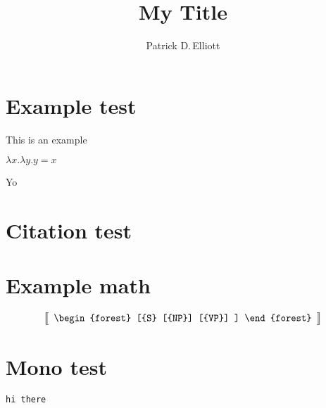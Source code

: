 \documentclass{ling-paper}
\title{My Title}
\author{Patrick D.\,Elliott}
\begin{document}
\maketitle

\section{Example test}

\ex
This is an example
\xe

\ex
\(λ x . λ y . y = x\)
\xe

Yo

\section{Citation test}

\section{Example math}

\[
\left\llbracket
\begin{array}{c}
\begin{forest}
[{S}
  [{NP}]
  [{VP}]
]
\end{forest}
\end{array}
\right\rrbracket
\]

\section{Mono test}

\texttt{hi there}

\printbibliography
\end{document}
